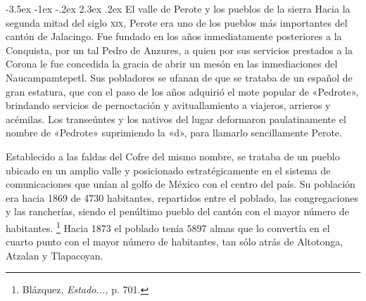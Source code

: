 \documentclass[14pt,twoside,final]{extbook} %
\makeatletter
\let\oldfootnote\footnote
\renewcommand\footnote[1]{%
\oldfootnote{\hspace{1mm}#1}}
\renewcommand\section{\@startsection {section}{1}{\z@}%
                                     {-3.5ex \@plus -1ex \@minus -.2ex}%
                                     {2.3ex \@plus .2ex}%
                                     {\normalfont\large\bfseries\sc}}
\makeatother
\begin{document}
\section{El valle de Perote y los pueblos de la sierra}
\label{sec:valle-de-perote-y-pueblos-sierra}
Hacia la segunda mitad del siglo \textsc{xix}, Perote era uno de los pueblos más importantes del cantón de Jalacingo. Fue fundado en los años inmediatamente posteriores a la Conquista, por un tal Pedro de Anzures, a quien por sus servicios prestados a la Corona le fue concedida la gracia de abrir un mesón en las inmediaciones del Naucampamtepetl. Sus pobladores se ufanan de que se trataba de un español de gran estatura, que con el paso de los años adquirió el mote popular de «Pedrote», brindando servicios de pernoctación y avituallamiento a viajeros, arrieros y acémilas. Los transeúntes y los nativos del lugar deformaron paulatinamente el nombre de «Pedrote» suprimiendo la «d», para llamarlo sencillamente Perote.

Establecido a las faldas del Cofre del mismo nombre, se trataba de un pueblo ubicado en un amplio valle y posicionado estratégicamente en el sistema de comunicaciones que unían al golfo de México con el centro del país. Su población era hacia 1869 de 4730 habitantes, repartidos entre el poblado, las congregaciones y las rancherías, siendo el penúltimo pueblo del cantón con el mayor número de habitantes.\footnote{Blázquez, \emph{Estado...,} p. 701.} Hacia 1873 el poblado tenía 5897 almas que lo convertía en el cuarto punto con el mayor número de habitantes, tan sólo atrás de Altotonga, Atzalan y Tlapacoyan.
\end{document}
